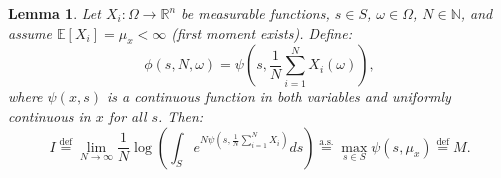 \documentclass{article}
\theoremstyle{plain}
\newtheorem{lemma}[theorem]{Lemma}
\theoremstyle{definition}
\theoremstyle{remark}
\begin{document}
\begin{lemma}\label{Lemma:Integral}
Let $X_i: \Omega \to \mathbb{R}^n$ be measurable functions, $s \in S$, $\omega \in \Omega$, $N \in \mathbb{N}$, and assume $\mathbb{E}[X_i] = \mu_x < \infty$ (first moment exists). Define:
\begin{equation}
\phi(s, N, \omega) = \psi\left(s, \frac{1}{N} \sum_{i=1}^N X_i(\omega)\right),
\end{equation}
where $\psi(x,s)$ is a continuous function in both variables and uniformly continuous in $x$ for all $s$.
Then:
\begin{equation}
I \overset{\text{def}}{=} \lim_{N \to \infty} \frac{1}{N} \log \left( \int_S e^{N \psi(s, \frac{1}{N} \sum_{i=1}^N X_i)} ds \right) \overset{\text{a.s.}}{=} \max_{s \in S} \psi(s, \mu_x) \overset{\text{def}}{=} M.
\end{equation}
\end{lemma}
\end{document}
